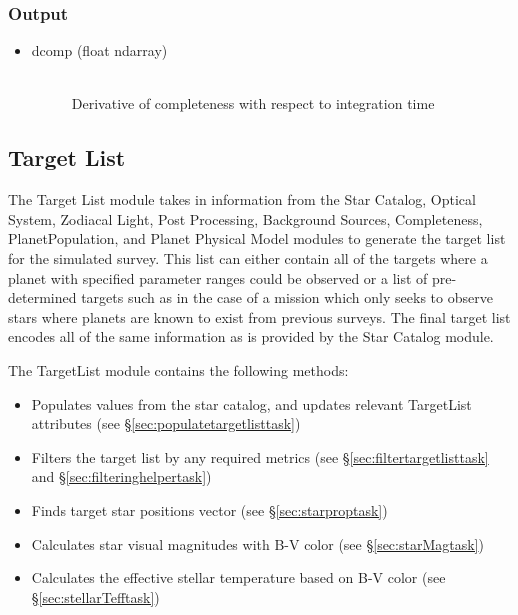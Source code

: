 \documentclass[cleanfoot]{asme2ej}
\begin{document}
\subsubsection*{Output}
\begin{itemize}
\item 
\begin{description}
    \item[dcomp (float ndarray)] \hfill \\
        Derivative of completeness with respect to integration time
\end{description}
\end{itemize}




\subsection{Target List}
The Target List module takes in information from the Star Catalog, Optical System, Zodiacal Light, Post Processing, Background Sources, Completeness, PlanetPopulation, and Planet Physical Model modules to generate the target list for the simulated survey.  This list can either contain all of the targets where a planet with specified parameter ranges could be observed or a list of pre-determined targets such as in the case of a mission which only seeks to observe stars where planets are known to exist from previous surveys.  The final target list encodes all of the same information as is provided by the Star Catalog module.

The TargetList module contains the following methods:
\begin{itemize}[leftmargin=2in,font={\ttfamily}]
    \item[\texttt populate\_target\_list] Populates values from the star catalog, and updates relevant TargetList attributes (see \S\ref{sec:populatetargetlisttask})
    \item[\texttt filter\_target\_list] Filters the target list by any required metrics (see \S\ref{sec:filtertargetlisttask} and \S\ref{sec:filteringhelpertask})
    \item[\texttt starprop] Finds target star positions vector (see \S\ref{sec:starproptask})
    \item[\texttt starMag] Calculates star visual magnitudes with B-V color (see \S\ref{sec:starMagtask})
    \item[\texttt stellarTeff] Calculates the effective stellar temperature based on B-V color (see \S\ref{sec:stellarTefftask})
\end{itemize}
\end{document}
